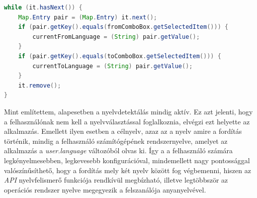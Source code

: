 \begin{spacing}{1.25}
\begin{lstlisting}[caption=Aktuális nyelvek beállítása, language=java, label={lst:kulcs_ertek}]
while (it.hasNext()) {
    Map.Entry pair = (Map.Entry) it.next();
    if (pair.getKey().equals(fromComboBox.getSelectedItem())) {
        currentFromLanguage = (String) pair.getValue();
    }
    if (pair.getKey().equals(toComboBox.getSelectedItem())) {
        currentToLanguage = (String) pair.getValue();
    }
    it.remove();
}
\end{lstlisting}
\end{spacing}

Mint említettem, alapesetben a nyelvdetektálás mindig aktív. Ez azt jelenti, hogy a felhasználónak nem kell a nyelvválasztással foglalkoznia, elvégzi ezt helyette az alkalmazás. Emellett ilyen esetben a célnyelv, azaz az a nyelv amire a fordítás történik, mindig a felhasználó számítógépének rendszernyelve, amelyet az alkalmazás a \textit{user.language} változóból olvas ki. Így a a felhasználó számára legkényelmesebben, legkevesebb konfigurációval, mindemellett nagy pontossággal valószínűsíthető, hogy a fordítás mely két nyelv között fog végbemenni, hiszen az \textit{API} nyelvfelismerő funkciója rendkívül megbízható, illetve legtöbbször az operációs rendszer nyelve megegyezik a felszanálója anyanyelvével.
